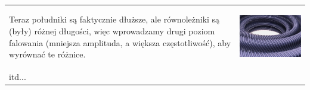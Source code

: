 \begin{frame}[plain]

\begin{tabular}{m{2.5in} m{2in}}
Teraz południki są faktycznie dłuższe, ale równoleżniki są (były) różnej długości, więc wprowadzamy drugi poziom falowania (mniejsza amplituda, a większa częstotliwość), aby wyrównać te różnice.
&\pause\begin{center}
\includegraphics[scale=0.5]{./pictures/C1-torus-step3.jpg}
\end{center}\\
itd... 
\end{tabular}
\end{frame}
\newpage


